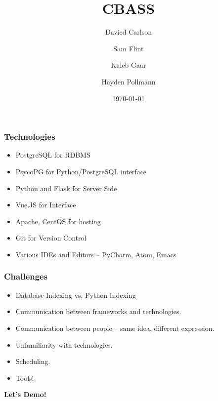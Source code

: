 \documentclass{beamer}
\title{CBASS}
\author{Davied Carlson \and Sam Flint \and Kaleb Gaar \and Hayden Pollmann}
\date{\today}
\begin{document}
\begin{frame}
  \titlepage
\end{frame}

\begin{frame}
  \frametitle{Technologies}\pause
  \begin{itemize}
  \item PostgreSQL for RDBMS \pause
  \item PsycoPG for Python/PostgreSQL interface \pause
  \item Python and Flask for Server Side \pause
  \item Vue.JS for Interface \pause
  \item Apache, CentOS for hosting \pause
  \item Git for Version Control \pause
  \item Various IDEs and Editors -- PyCharm, Atom, Emacs
  \end{itemize}
\end{frame}

\begin{frame}
  \frametitle{Challenges}\pause
  \begin{itemize}
  \item Database Indexing vs. Python Indexing \pause
  \item Communication between frameworks and technologies.\pause
  \item Communication between people -- same idea, different expression.\pause
  \item Unfamiliarity with technologies.\pause
  \item Scheduling.\pause
  \item Tools!
  \end{itemize}
\end{frame}

\begin{frame}
  \begin{center}
    \Huge\bfseries\sffamily
    Let's Demo!
  \end{center}
\end{frame}
\end{document}
